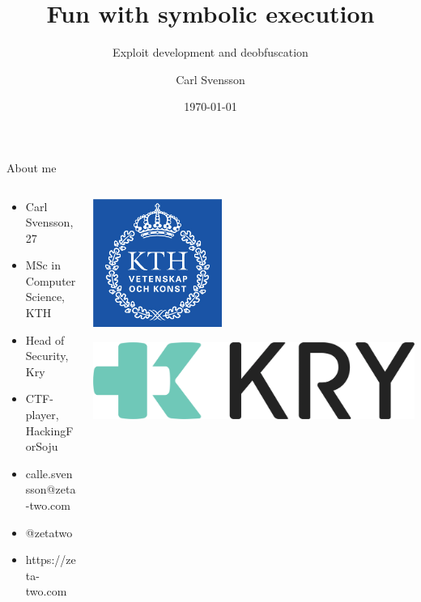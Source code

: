 \documentclass[10pt, compress]{beamer}
\title{Fun with symbolic execution}
\subtitle{Exploit development and deobfuscation}
\date{\today}
\author{Carl Svensson}
\institute{SEC-T 2018}
\begin{document}
\maketitle

\begin{frame}{About me}
  
	\begin{columns}
		\begin{column}{0.6\textwidth}  
  
  		\begin{itemize}
		  \item Carl Svensson, 27
		  \item MSc in Computer Science, KTH
		  \item Head of Security, Kry
		  \item CTF-player, HackingForSoju
		  \item \faEnvelope \hskip 2mm calle.svensson@zeta-two.com
		  \item \faTwitter \hskip 2mm  @zetatwo
		  \item \faGlobe \hskip 2mm https://zeta-two.com
		\end{itemize}
		
		\end{column}
		\begin{column}{0.4\textwidth} 
			\begin{center}
			\includegraphics[width=0.4\textwidth]{images/kth.jpg}
			\end{center}
			\vspace{1cm}
			\includegraphics[width=\textwidth]{images/kry_logo.png}
		\end{column}
	\end{columns}
  
\end{frame}
\end{document}

